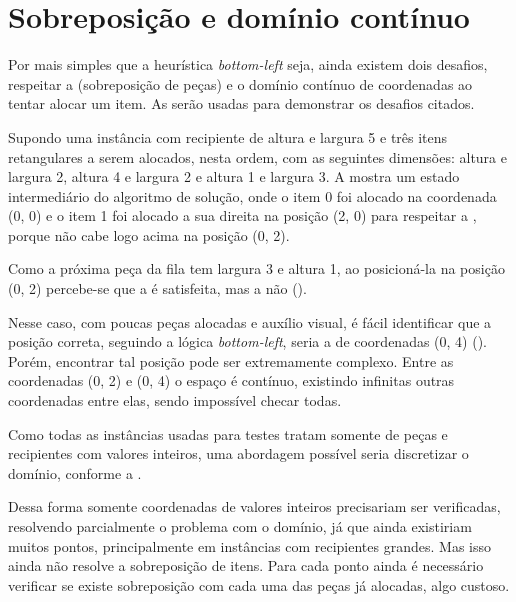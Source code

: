 \section{Sobreposição e domínio contínuo}\label{sec:sobreposicao-e-dominio-infinito}

Por mais simples que a heurística \textit{bottom-left} seja, ainda existem dois desafios,
respeitar a  (sobreposição de peças) e o domínio contínuo de coordenadas
ao tentar alocar um item.
As  serão usadas para
demonstrar os desafios citados.

Supondo uma instância com recipiente de altura e largura 5 e três itens retangulares a serem
alocados, nesta ordem, com as seguintes dimensões: altura e largura 2, altura 4 e largura 2 e
altura 1 e largura 3.
A  mostra um estado intermediário do algoritmo de solução, onde o
item 0 foi alocado na coordenada (0, 0) e o item 1 foi alocado a sua direita na posição (2, 0)
para respeitar a , porque não cabe logo acima na posição (0, 2).




Como a próxima peça da fila tem largura 3 e altura 1, ao posicioná-la na posição (0, 2)
percebe-se que a  é satisfeita, mas a  não ().



Nesse caso, com poucas peças alocadas e auxílio visual, é fácil identificar que a posição correta,
seguindo a lógica \textit{bottom-left}, seria a de coordenadas (0, 4)
().
Porém, encontrar tal posição pode ser extremamente complexo.
Entre as coordenadas (0, 2) e (0, 4) o espaço é contínuo, existindo infinitas outras coordenadas
entre elas, sendo impossível checar todas.



Como todas as instâncias usadas para testes tratam somente de peças e recipientes com valores
inteiros, uma abordagem possível seria discretizar o domínio, conforme a
.



Dessa forma somente coordenadas de valores inteiros precisariam ser verificadas, resolvendo
parcialmente o problema com o domínio, já que ainda existiriam muitos pontos, principalmente em
instâncias com recipientes grandes.
Mas isso ainda não resolve a sobreposição de itens.
Para cada ponto ainda é necessário verificar se existe sobreposição com cada uma das peças já
alocadas, algo custoso.

